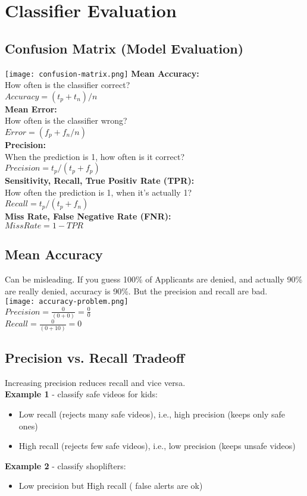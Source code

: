 \section{Classifier Evaluation}
\subsection{Confusion Matrix (Model Evaluation)}
\texttt{[image: confusion-matrix.png]}
\textbf{Mean Accuracy:}\\
How often is the classifier correct?\\
$Accuracy = (t_p + t_n) / n$\\
\textbf{Mean Error:}\\
How often is the classifier wrong?\\
$Error = (f_p + f_n / n)$\\
\textbf{Precision:}\\
When the prediction is 1, how often is it correct?\\
$Precision = t_p / (t_p + f_p)$\\
\textbf{Sensitivity, Recall, True Positiv Rate (TPR):}\\
How often the prediction is 1, when it's actually 1?\\
$Recall = t_p / (t_p + f_n)$\\
\textbf{Miss Rate, False Negative Rate (FNR):}\\
$Miss Rate = 1 - TPR$

\subsection{Mean Accuracy}
Can be misleading. If you guess 100\% of Applicants are denied, and actually 90\% are really denied, accuracy is 90\%.
But the precision and recall are bad.\\
\texttt{[image: accuracy-problem.png]}\\
$Precision = \frac{0}{(0 + 0)} = \frac{0}{0}$\\
$Recall = \frac{0}{(0 + 10)} = 0$

\subsection{Precision vs. Recall Tradeoff}
Increasing precision reduces recall and vice versa.\\
\textbf{Example 1} - classify safe videos for kids:
\begin{itemize}
  \item Low recall (rejects many safe videos), i.e., high precision (keeps only safe ones)
  \item High recall (rejects few safe videos), i.e., low precision (keeps unsafe videos)
\end{itemize}
\textbf{Example 2} - classify shoplifters:
\begin{itemize}
  \item Low precision but High recall ( false alerts are ok)
\end{itemize}

